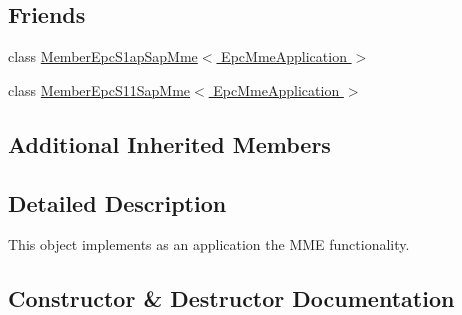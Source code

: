 \subsection*{Friends}
\begin{DoxyCompactItemize}
\item 
class \hyperlink{classns3_1_1EpcMmeApplication_a22269751c319acf6b5548bb04400ba6a}{Member\+Epc\+S1ap\+Sap\+Mme$<$ Epc\+Mme\+Application $>$}
\item 
class \hyperlink{classns3_1_1EpcMmeApplication_a638765700ca06374869b71af353fbe71}{Member\+Epc\+S11\+Sap\+Mme$<$ Epc\+Mme\+Application $>$}
\end{DoxyCompactItemize}
\subsection*{Additional Inherited Members}


\subsection{Detailed Description}
This object implements as an application the M\+ME functionality. 

\subsection{Constructor \& Destructor Documentation}
